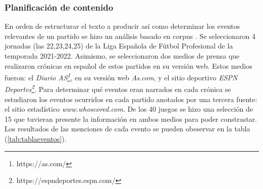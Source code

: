 \subsubsection{Planificación de contenido}

    En orden de estructurar el texto a producir así como determinar los eventos relevantes de un partido se hizo un análisis basado en 
corpus . Se seleccionaron 4 jornadas (las 22,23,24,25) de la Liga Española de Fútbol Profesional de la temporada 
2021-2022. Asimismo, se seleccionaron dos medios de prensa que realizaron crónicas en español de estos partidos en su versión web. Estos medios 
fueron: el \textit{Diario AS\footnote[1]{https://as.com/}}, en su versión web \textit{As.com}, y el sitio deportivo 
\textit{ESPN Deportes\footnote[2]{https://espndeportes.espn.com/}}. Para determinar qué eventos eran narrados en cada crónica se 
estudiaron los eventos ocurridos en cada partido anotados por una tercera fuente: el sitio estadístico \textit{www.whoscored.com}. 
De los 40 juegos se hizo una selección de 15 que tuvieran presente la información en ambos medios para poder constrastar. Los resultados de las 
menciones de cada evento se pueden obeservar en la tabla (\ref{tab:tablaeventos}).\\

